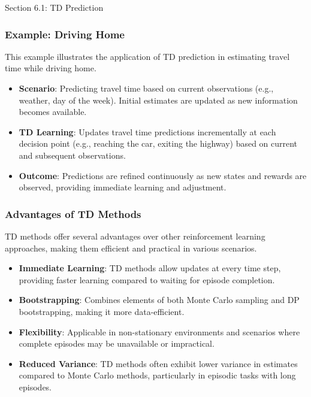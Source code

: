 \begin{notes}{Section 6.1: TD Prediction}
\begin{highlight}
    \end{highlight}
    
    \subsubsection*{Example: Driving Home}
    
    This example illustrates the application of TD prediction in estimating travel time while driving home.
    
    \begin{highlight}
    
        \begin{itemize}
            \item \textbf{Scenario}: Predicting travel time based on current observations (e.g., weather, day of the week). Initial estimates are updated as new information becomes available.
            \item \textbf{TD Learning}: Updates travel time predictions incrementally at each decision point (e.g., reaching the car, exiting the highway) based on current and subsequent observations.
            \item \textbf{Outcome}: Predictions are refined continuously as new states and rewards are observed, providing immediate learning and adjustment.
        \end{itemize}
    
    \end{highlight}
    
    \subsubsection*{Advantages of TD Methods}
    
    TD methods offer several advantages over other reinforcement learning approaches, making them efficient and practical in various scenarios.
    
    \begin{highlight}
    
        \begin{itemize}
            \item \textbf{Immediate Learning}: TD methods allow updates at every time step, providing faster learning compared to waiting for episode completion.
            \item \textbf{Bootstrapping}: Combines elements of both Monte Carlo sampling and DP bootstrapping, making it more data-efficient.
            \item \textbf{Flexibility}: Applicable in non-stationary environments and scenarios where complete episodes may be unavailable or impractical.
            \item \textbf{Reduced Variance}: TD methods often exhibit lower variance in estimates compared to Monte Carlo methods, particularly in episodic tasks with long episodes.
        \end{itemize}
    

\end{highlight}
\end{notes}
